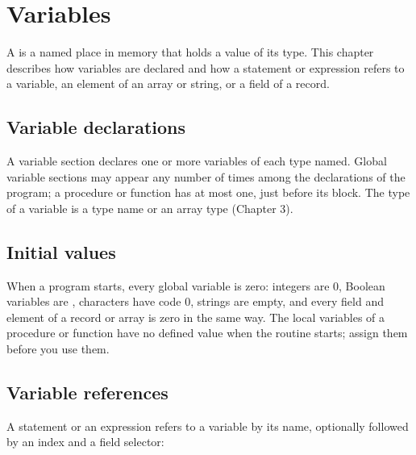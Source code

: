 \chapter{Variables}

A  is a named place in memory that holds a value of its
type.  This chapter describes how variables are declared and how a
statement or expression refers to a variable, an element of an array or
string, or a field of a record.

\section{Variable declarations}

A variable section declares one or more variables of each type named.
Global variable sections may appear any number of times among the
declarations of the program; a procedure or function has at most one, just
before its block.  The type of a variable is a type name or an array type
(Chapter 3).

\section{Initial values}
When a program starts, every global variable is zero: integers are 0,
Boolean variables are , characters have code 0, strings are
empty, and every field and element of a record or array is zero in the
same way.  The local variables of a procedure or function have no defined
value when the routine starts; assign them before you use them.

\section{Variable references}
A statement or an expression refers to a variable by its name, optionally
followed by an index and a field selector:

